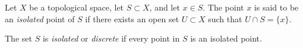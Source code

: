 \documentclass[12pt]{article}
\begin{document}
Let $X$ be a topological space, let $S \subset X$, and let $x \in S$. The point $x$ is said to be an \emph{isolated} point of $S$ if there exists an open set $U \subset X$ such that $U \cap S = \{x\}$.

The set $S$ is \emph{isolated} or \emph{discrete} if every point in $S$ is an isolated point.
\end{document}
